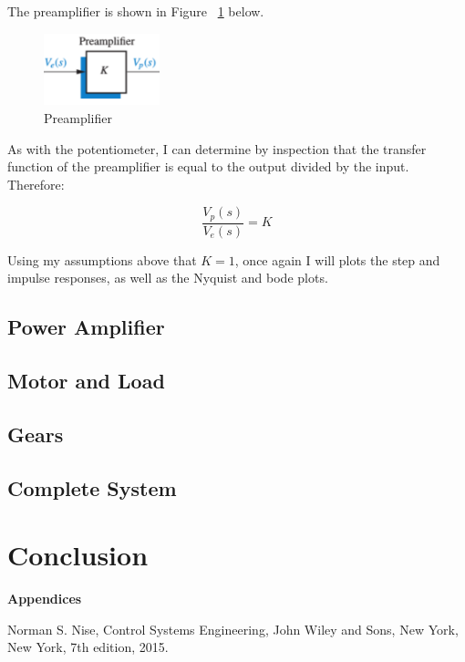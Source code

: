 \documentclass[12pt]{article}
\begin{document}
The preamplifier is shown in Figure ~\ref{fig:preamp} below.

\begin{figure}[H]
\begin{center}
	\includegraphics[width=0.3\textwidth]{./img/PreamplifierBlock.png}
	\caption{\label{fig:preamp}Preamplifier}
\end{center}
\end{figure}

As with the potentiometer, I can determine by inspection that the transfer function of the preamplifier is equal to the output divided by the input. Therefore:

\begin{equation}
\frac{V_{p}(s)}{V_{e}(s)} = K\label{eq:2}
\end{equation}

Using my assumptions above that $K = 1$, once again I will plots the step and impulse responses, as well as the Nyquist and bode plots.


\subsection{Power Amplifier}

\subsection{Motor and Load}

\subsection{Gears}

\subsection{Complete System}

\section{Conclusion}

\pagebreak

\textbf{Appendices}

\begin{appendices}


\end{appendices}

\begin{thebibliography}{9}

  Norman S. Nise,
  Control Systems Engineering,
  John Wiley and Sons, New York, New York,
  7th edition,
  2015.

\end{thebibliography}
\end{document}
